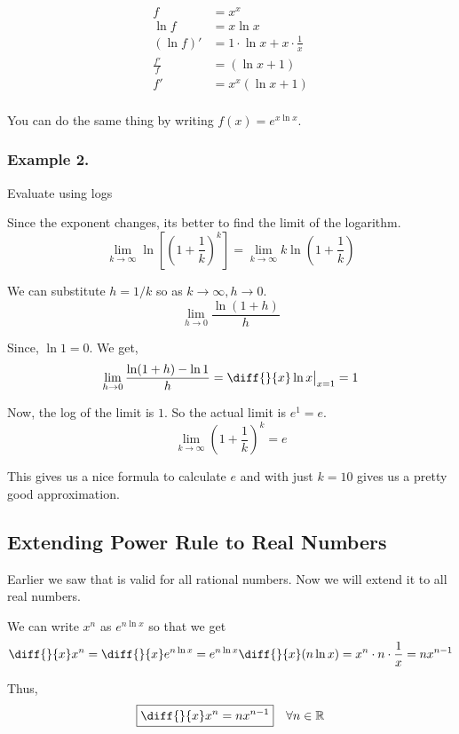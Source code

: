 \begin{align*}
	f & = x^x \\
	\ln f & = x \ln x \\
	(\ln f)' & = 1 \cdot \ln x + x \cdot \frac{1}{x} \\
	\frac{f'}{f} & = (\ln x + 1) \\
	f' & = x^x(\ln x + 1) \\
\end{align*}

You can do the same thing by writing $f(x) = e^{x \ln x}$.

\subsubsection{Example 2.}
Evaluate using logs 

Since the exponent changes, its better to find the limit of the logarithm.
$$
\lim_{k \to \infty} \ln \left[ \left( 1 + \frac{1}{k} \right)^k \right]
	= \lim_{k \to \infty} k \ln \left( 1 + \frac{1}{k} \right)
$$

We can substitute $h = 1/k$ so as $k \to \infty, h \to 0$.
$$ \lim_{h \to 0} \frac{\ln(1+h)}{h} $$

Since, $\ln 1 = 0$. We get,
$$ \lim_{h \to 0} \frac{\ln(1+h) - \ln 1}{h} = \diff{}{x} \ln x \big|_{x=1} = 1 $$

Now, the log of the limit is $1$. So the actual limit is $e^1 = e$.
$$ \lim_{k \to \infty} \left( 1 + \frac{1}{k} \right)^k = e $$

This gives us a nice formula to calculate $e$ and with just $k = 10$ gives us a pretty good approximation.


\subsection{Extending Power Rule to Real Numbers}

Earlier we saw that  is valid for all rational numbers.
Now we will extend it to all real numbers.

We can write $x^n$ as $e^{n \ln x}$ so that we get
$$ \diff{}{x} x^n = \diff{}{x} e^{n \ln x}
	= e^{n \ln x} \diff{}{x} (n \ln x)
	= x^n \cdot n \cdot \frac{1}{x}
	= n x^{n-1}
$$

Thus, $$ \boxed{ \diff{}{x} x^n = nx^{n-1} } \quad \forall n \in \mathbb{R} $$
